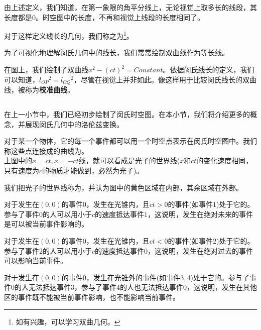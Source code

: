 由上述定义，我们知道，在第一象限的角平分线上，无论视觉上取多长的线段，其长度都是0。时空图中的长度，不再和视觉上线段的长度相同了。

对于这样定义线长的几何，我们称之为\footnote{如有兴趣，可以学习双曲几何。}。

为了可视化地理解闵氏几何中的线长，我们常常绘制双曲线作为等长线。

在图上，我们绘制了双曲线$x^2-(ct)^2=Constant$。依据闵氏线长的定义，我们可以知道，$l_{OP}{}^2=l_{OQ}{}^2$，尽管在视觉上并非如此。像这样用于比较闵氏线长的双曲线，被称为\textbf{校准曲线}。
\subsection[闵氏几何中的洛伦兹变换]{}
在上一小节中，我们已经初步绘制了闵氏时空图。在本小节，我们将介绍更多的概念，并展现闵氏几何中的洛伦兹变换。

\begin{Itemize}
	\item {} 对于某一个物体，它的每一个事件都可以用一个时空点表示在闵氏时空图中。我们称这些点连接成的曲线为。\\
	\eg 上图中的$x=ct,x=-ct$线，就可以看成是光子的世界线($x$和$ct$的变化速度相同，只有速度为$c$的物质才能做到，必然为光子)。
	\item {} 我们把光子的世界线称为，并认为图中的黄色区域在内部，其余区域在外部。
	\item {} 对于发生在$(0,0)$的事件$0$，发生在光锥内，且$ct>0$的事件(如事件$1$)处于它的。参与了事件$0$的人可以用小于$c$的速度抵达事件$1$，这说明，发生在绝对未来的事件是可以被当前事件影响的。
	\item {} 对于发生在$(0,0)$的事件$0$，发生在光锥内，且$ct<0$的事件(如事件$2$)处于它的。参与了事件$2$的人可以用小于$c$的速度抵达事件$0$，这说明，发生在绝对过去的事件可以影响当前事件。
	\item {} 对于发生在$(0,0)$的事件$0$，发生在光锥外的事件(如事件$3,4$)处于它的。参与了事件$0$的人无法抵达事件$3$，参与了事件$4$的人也无法抵达事件$0$，这说明，发生在其他区的事件既不能被当前事件影响，也不能影响当前事件。
\end{Itemize}

